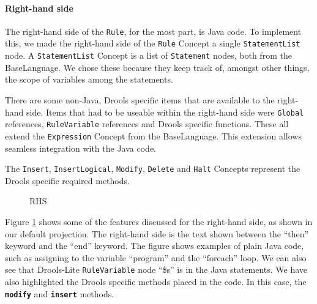 \paragraph{Right-hand side} The right-hand side of the \texttt{Rule}, for the most part, is Java code.
To implement this, we made the right-hand side of the \texttt{Rule} Concept a single \texttt{StatementList} node.
A \texttt{StatementList} Concept is a list of \texttt{Statement} nodes, both from the BaseLanguage.
We chose these because they keep track of, amongst other things, the scope of variables among the statements.

There are some non-Java, Drools specific items that are available to the right-hand side.
Items that had to be useable within the right-hand side were \texttt{Global} references, \texttt{RuleVariable} references and Drools specific functions.
These all extend the \texttt{Expression} Concept from the BaseLanguage.
This extension allows seamless integration with the Java code.

The \texttt{Insert}, \texttt{InsertLogical}, \texttt{Modify}, \texttt{Delete} and \texttt{Halt} Concepts represent the Drools specific required methods.

\begin{figure}[H]
    \centering
    \caption{RHS}
    \label{fig:RHS}
\end{figure}

Figure \ref{fig:RHS} shows some of the features discussed for the right-hand side, as shown in our default projection.
The right-hand side is the text shown between the ``then'' keyword and the ``end'' keyword.
The figure shows examples of plain Java code, such as assigning to the variable ``program'' and the ``foreach'' loop.
We can also see that Drools-Lite \texttt{RuleVariable} node ``\$s'' is in the Java statements.
We have also highlighted the Drools specific methods placed in the code.
In this case, the \texttt{\textbf{modify}} and \texttt{\textbf{insert}} methods.   

